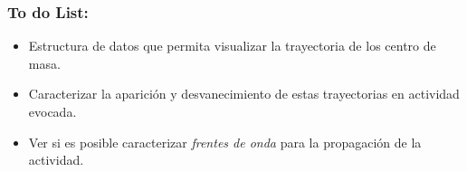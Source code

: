 \documentclass{beamer}
\begin{document}
\begin{frame}
  \frametitle{To do List:}
  
  \begin{itemize}
  \item Estructura de datos que permita visualizar la trayectoria de los centro de masa.
  \item Caracterizar la aparición y desvanecimiento de estas trayectorias en actividad evocada.
  \item Ver si es posible caracterizar \emph{frentes de onda} para la propagación
    de la actividad. 

  \end{itemize}
  
\end{frame}
\end{document}
